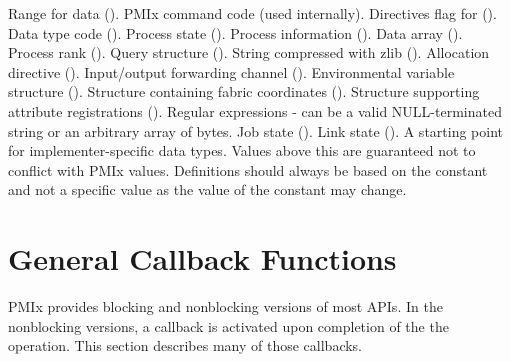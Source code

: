 \begin{constantdesc}
Range for data ().
%
PMIx command code (used internally).
%
Directives flag for  ().
%
Data type code ().
%
Process state ().
%
Process information ().
%
Data array ().
%
Process rank ().
%
Query structure ().
%
String compressed with zlib ().
%
Allocation directive ().
%
Input/output forwarding channel ().
%
Environmental variable structure ().
%
Structure containing fabric coordinates ().
%
Structure supporting attribute registrations ().
%
Regular expressions - can be a valid NULL-terminated string or an arbitrary array of bytes.
%
Job state ().
%
Link state ().
%
A starting point for implementer-specific data types.
Values above this are guaranteed not to conflict with \ac{PMIx} values.
Definitions should always be based on the  constant and not a specific value as the value of the constant may change.
%
\end{constantdesc}


\section{General Callback Functions}

PMIx provides blocking and nonblocking versions of most APIs.
In the nonblocking versions, a callback is activated upon completion of the the operation.
This section describes many of those callbacks.

